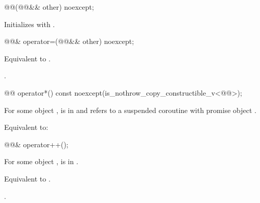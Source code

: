 %
\begin{itemdecl}
@@(@@&& other) noexcept;
\end{itemdecl}

\begin{itemdescr}
\pnum
\effects
Initializes 
with .
\end{itemdescr}

%
\begin{itemdecl}
@@& operator=(@@&& other) noexcept;
\end{itemdecl}

\begin{itemdescr}
\pnum
\effects
Equivalent to
.

\pnum
\returns
{}.
\end{itemdescr}

%
\begin{itemdecl}
@@ operator*() const noexcept(is_nothrow_copy_constructible_v<@@>);
\end{itemdecl}

\begin{itemdescr}
\pnum
\expects
For some  object ,
 is in  and
 refers to
a suspended coroutine with promise object .

\pnum
\effects
Equivalent to:
\end{itemdescr}

%
\begin{itemdecl}
@@& operator++();
\end{itemdecl}

\begin{itemdescr}
\pnum
\expects
For some  object ,
 is in .

\pnum
\effects
Equivalent to .

\pnum
\returns
{}.
\end{itemdescr}

